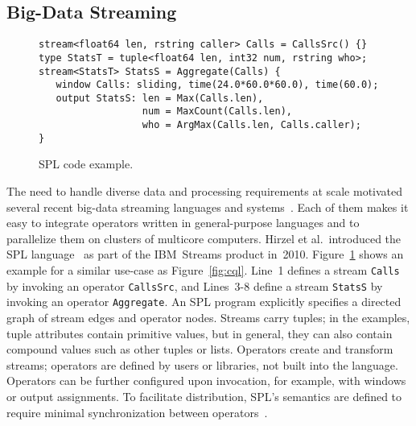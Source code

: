 \subsection{Big-Data Streaming}\label{sec:big} %

\begin{figure}[!h]
\begin{lstlisting}[xleftmargin=1mm]
stream<float64 len, rstring caller> Calls = CallsSrc() {}
type StatsT = tuple<float64 len, int32 num, rstring who>;
stream<StatsT> StatsS = Aggregate(Calls) {
   window Calls: sliding, time(24.0*60.0*60.0), time(60.0);
   output StatsS: len = Max(Calls.len),
                  num = MaxCount(Calls.len),
                  who = ArgMax(Calls.len, Calls.caller);
}
\end{lstlisting}
\vspace*{-4mm}
\caption{\label{fig:spl}SPL code example.}
\end{figure}

The need to handle diverse data and processing requirements at scale
motivated several recent big-data streaming languages and
systems~\cite{akidau_et_al_2013,carbone_et_al_2015,hirzel_schneider_gedik_2017,toshniwal_et_al_2014,zaharia_et_al_2013}.
Each of them makes it easy to integrate operators written in
general-purpose languages and to parallelize them on clusters of
multicore computers. Hirzel et al.\ introduced the SPL
language~\cite{hirzel_schneider_gedik_2017} as part of the IBM~Streams
product in~2010. Figure~\ref{fig:spl} shows an example for a similar
use-case as Figure~\ref{fig:cql}. Line~1 defines a stream
\lstinline{Calls} by invoking an operator \lstinline{CallsSrc}, and
\mbox{Lines 3-8} define a stream \lstinline{StatsS} by invoking an
operator \lstinline{Aggregate}. An SPL program explicitly specifies a
directed graph of stream edges and operator nodes. Streams carry
tuples; in the examples, tuple attributes contain primitive values,
but in general, they can also contain compound values such as other
tuples or lists.  Operators create and transform streams; operators
are defined by users or libraries, not built into the
language. Operators can be further configured upon invocation, for
example, with windows or output assignments. To facilitate
distribution, SPL's semantics are defined to require minimal
synchronization between operators~\cite{soule_et_al_2016}.

